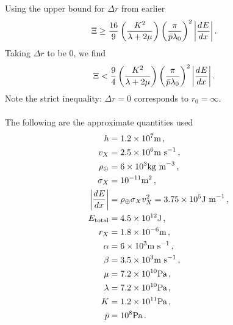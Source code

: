 \documentclass{article}
\newcommand*\te[1]{\text{#1}}
\newcommand*\p[1]{\left(#1\right)}
\newcommand*\f[2]{\frac{#1}{#2}}
\newcommand*\td[3]{\frac{d^{#3}#1}{d #2^{#3}}}
\begin{document}
Using the upper bound for $\Delta r$ from earlier
\begin{align}
\Xi&\geq\f{16}{9}\p{\f{K^2}{\lambda+2\mu}}\p{\f{\pi}{\bar p\lambda_0}}^2\abs{\td{E}{x}{}}\,.
\end{align}
Taking $\Delta r$ to be 0, we find
\begin{align}
\Xi&<\f{9}{4}\p{\f{K^2}{\lambda+2\mu}}\p{\f{\pi}{\bar p\lambda_0}}^2\abs{\td{E}{x}{}}\,.
\end{align}
Note the strict inequality: $\Delta r=0$ corresponds to $r_0=\infty$.
\\\\
The following are the approximate quantities used
\begin{align}
h&=1.2\times 10^7\te{m}\,,\\
v_X&=2.5\times 10^6\te{m s}^{-1}\,,\\
\rho_{\oplus}&=6\times 10^3\te{kg m}^{-3}\,,\\
\sigma_X&=10^{-11}\te{m}^2\,,\\
\abs{\td{E}{x}{}}&=\rho_{\oplus}\sigma_X v_X^2=3.75\times 10^5\te{J m}^{-1}\,,\\
E_{\te{total}}&=4.5\times 10^{12}\te{J}\,,\\
r_X&=1.8\times 10^{-6}\te{m}\,,\\
\alpha&=6\times 10^3\te{m s}^{-1}\,,\\
\beta&=3.5\times 10^{3}\te{m s}^{-1}\,,\\
\mu&=7.2\times 10^{10}\te{Pa}\,,\\
\lambda&=7.2\times 10^{10}\te{Pa}\,,\\
K&=1.2\times 10^{11}\te{Pa}\,,\\
\bar p&=10^8\te{Pa}\,.
\end{align}
\end{document}
